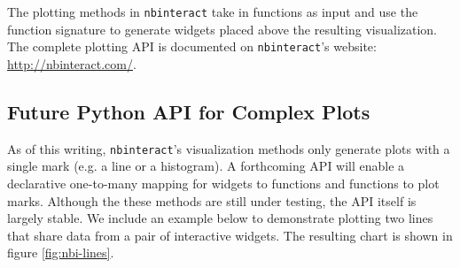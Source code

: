 \documentclass[nobib]{tufte-handout}
\newcommand{\code}[1]{\texttt{#1}}
\begin{document}
The plotting methods in \code{nbinteract} take in functions as input and use
the function signature to generate widgets placed above the resulting
visualization. The complete plotting API is documented on \code{nbinteract}'s
website: \url{http://nbinteract.com/}.


\newpage

\subsection{Future Python API for Complex Plots} %
\label{sub:future_plotting_api}

As of this writing, \code{nbinteract}'s visualization methods only generate
plots with a single mark (e.g. a line or a histogram). A forthcoming API will
enable a declarative one-to-many mapping for widgets to functions and functions
to plot marks. Although the these methods are still under testing, the API
itself is largely stable. We include an example below to demonstrate plotting
two lines that share data from a pair of interactive widgets. The resulting
chart is shown in figure \ref{fig:nbi-lines}.
\end{document}
